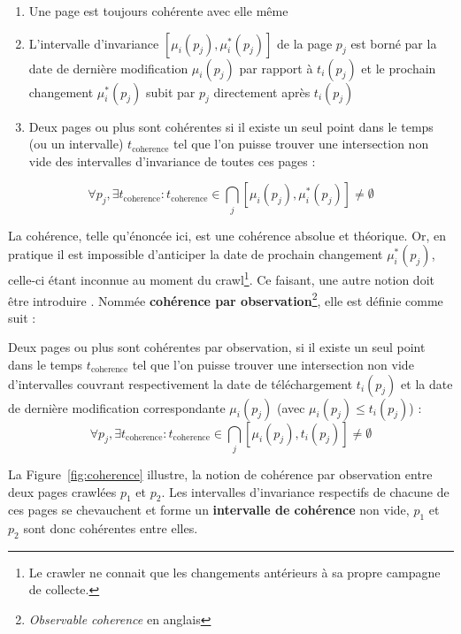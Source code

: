 \documentclass[symmetric,justified,marginals=raggedouter]{tufte-book}
\begin{document}
\begin{itshape}
\begin{enumerate}[leftmargin=*]  
\item Une page est toujours cohérente avec elle même
\item L'intervalle d'invariance $[\mu_i(p_j),\mu^*_i(p_j)]$ de la page $p_j$ est borné par la date de dernière modification $\mu_i(p_j)$ par rapport à $ t_i(p_j)$ et le prochain changement $\mu^*_i(p_j)$ subit par $p_j$ directement après $t_i(p_j)$
\item Deux pages ou plus sont cohérentes si il existe un seul point dans le temps (ou un intervalle) $t_{\mathrm{coherence}}$ tel que l'on puisse trouver une intersection non vide des intervalles d'invariance de toutes ces pages :
\end{enumerate}
\[
	\forall p_j, \exists t_{\mathrm{coherence}}:t_{\mathrm{coherence}} \in \bigcap_{j}[\mu_i(p_j),\mu^*_i(p_j)] \neq \emptyset
\]
\end{itshape}

\noindent La cohérence, telle qu'énoncée ici, est une cohérence absolue et théorique. Or, en pratique il est impossible d'anticiper la date de prochain changement $\mu^*_i(p_j)$, celle-ci étant inconnue au moment du crawl\footnote{\RaggedOuter Le crawler ne connait que les changements antérieurs à sa propre campagne de collecte.}. Ce faisant, une autre notion doit être introduire \citep{spaniol_data_2009}. Nommée \textbf{cohérence par observation}\footnote{\RaggedOuter \textit{Observable coherence} en anglais}, elle est définie comme suit :\\

\begin{itshape}
\noindent Deux pages ou plus sont cohérentes par observation, si il existe un seul point dans le temps $t_{\mathrm{coherence}}$ tel que l'on puisse trouver une intersection non vide d'intervalles couvrant respectivement la date de téléchargement $t_i(p_j)$ et la date de dernière modification correspondante $\mu_i(p_j)$ (avec $\mu_i(p_j) \leq t_i(p_j)$) :
\[
	\forall p_j, \exists t_{\mathrm{coherence}}:t_{\mathrm{coherence}} \in \bigcap_{j}[\mu_i(p_j),t_i(p_j)] \neq \emptyset
\]
\end{itshape}

\noindent La Figure~\ref{fig:coherence} illustre, la notion de cohérence par observation entre deux pages crawlées $p_1$ et $p_2$. Les intervalles d'invariance respectifs de chacune de ces pages se chevauchent et forme un \textbf{intervalle de cohérence} non vide, $p_1$ et $p_2$ sont donc cohérentes entre elles.
\end{document}
